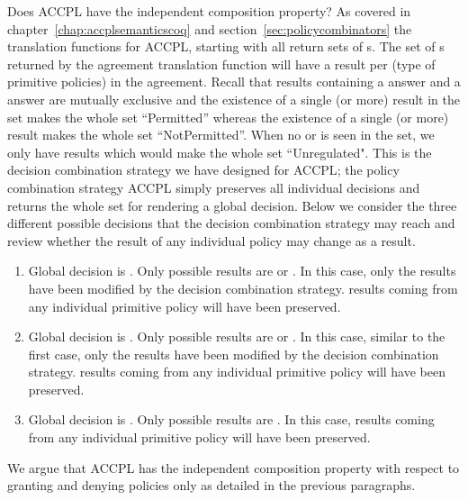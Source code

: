 Does \ac{ACCPL} have the independent composition property? As covered in chapter~\ref{chap:accplsemanticscoq} and section~\ref{sec:policycombinators} the translation functions for \ac{ACCPL}, starting with  all return sets of s.  The set of s returned by the agreement translation function will have a result per  (type of primitive policies) in the agreement. Recall that results containing a  answer and a  answer are mutually exclusive and the existence of a single (or more)  result in the set makes the whole set ``Permitted'' whereas the existence of a single (or more)  result makes the whole set ``NotPermitted''. When no  or  is seen in the set, we only have  results which would make the whole set ``Unregulated". This is the decision combination strategy we have designed for \ac{ACCPL}; the policy combination strategy \ac{ACCPL} simply preserves all individual decisions and returns the whole set for rendering a global decision. Below we consider the three different possible decisions that the decision combination strategy may reach and review whether the result of any individual policy may change as a result.

\begin{enumerate}
  \item Global decision is . Only possible results are  or . In this case, only the  results have been modified by the decision combination strategy.  results coming from any individual primitive policy will have been preserved.
  \item Global decision is . Only possible results are  or . In this case, similar to the first case, only the  results have been modified by the decision combination strategy.  results coming from any individual primitive policy will have been preserved.
   \item Global decision is . Only possible results are .  In this case, results coming from any individual primitive policy will have been preserved.
\end{enumerate}

We argue that \ac{ACCPL} has the independent composition property with respect to granting and denying policies only as detailed in the previous paragraphs. 

